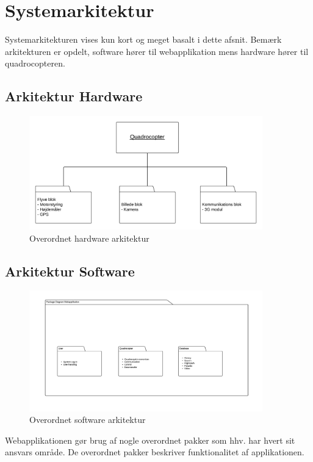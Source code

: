 \chapter{Systemarkitektur}
\label{chap:arkitektur}

Systemarkitekturen vises kun kort og meget basalt i dette afsnit.
Bemærk arkitekturen er opdelt, software hører til webapplikation mens hardware hører til quadrocopteren.


\section{Arkitektur Hardware}
\label{sec:Arkitektur hw}

\begin{figure}[H]
\centering
\includegraphics[width=0.9\textwidth]{Billeder/hw_arkitektur.png}
\caption{Overordnet hardware arkitektur}
\label{fig:hw_arkitektur}
\end{figure}		


\section{Arkitektur Software}
\label{sec:Arkitektur sw}

\begin{figure}[H]
\centering
\includegraphics[width=0.9\textwidth]{Billeder/sw-arkitektur.png}
\caption{Overordnet software arkitektur}
\label{fig:sw_arkitektur}
\end{figure}	

Webapplikationen gør brug af nogle overordnet pakker som hhv. har hvert sit ansvars område. De overordnet pakker beskriver funktionalitet af applikationen.